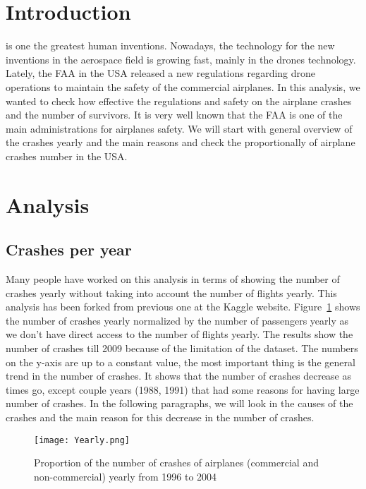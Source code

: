 \documentclass[journal]{IEEEtran}
\begin{document}
\IEEEpeerreviewmaketitle



\section{Introduction}
 is one the greatest human inventions. Nowadays, the technology for the new inventions in the
aerospace field is growing fast, mainly in the drones technology. Lately, the FAA in the USA released a new regulations regarding
 drone operations to maintain the safety
of the commercial airplanes. In this analysis, we wanted to check how effective the regulations and safety on the airplane crashes
and the number of survivors. It is very
well known that the FAA is one of the main administrations for airplanes safety. We will start with general overview of the crashes
yearly and the main reasons and check the proportionally of airplane crashes number in the USA.
\section{Analysis}
\subsection{Crashes per year}
Many people have worked on this analysis in terms of showing the number of crashes yearly without taking into
account the number of flights yearly. This analysis has been forked from previous one at the Kaggle website. Figure~\ref{yearly} shows the number of crashes yearly normalized by the number
of passengers yearly  as we don't have direct access to the number of flights yearly. The results show the number of crashes
till 2009 because of the limitation of the dataset. The numbers on the y-axis are up to
a constant value, the most important thing is the general trend in the number of crashes. It shows that the number of
crashes decrease as times go, except couple years (1988, 1991) that had some reasons for having large number of crashes.
 In the following paragraphs, we will
look in the causes of the crashes and the main reason for this decrease in the number of crashes.
\begin{figure}
  \centering
    \texttt{[image: Yearly.png]}
    \caption{Proportion of the number of crashes of airplanes (commercial and non-commercial) yearly from 1996 to 2004}\label{yearly}
\end{figure}
\end{document}
